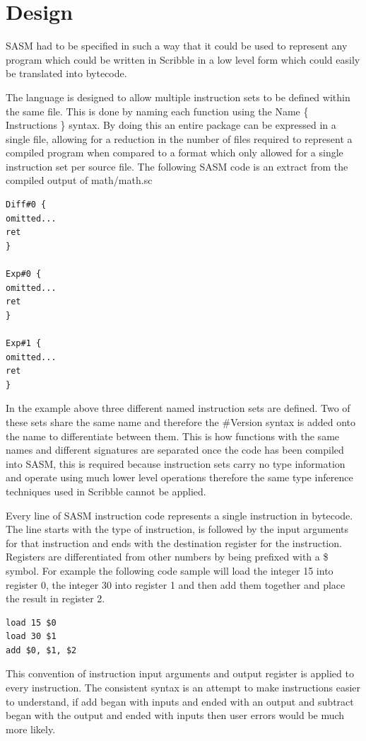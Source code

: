 \documentclass[]{final_report}
\begin{document}
\section{Design}

SASM had to be specified in such a way that it could be used to represent any program which could be written in Scribble in a low level form which could easily be translated into bytecode.

The language is designed to allow multiple instruction sets to be defined within the same file. This is done by naming each function using the Name \{ Instructions \} syntax. By doing this an entire package can be expressed in a single file, allowing for a reduction in the number of files required to represent a compiled program when compared to a format which only allowed for a single instruction set per source file. The following SASM code is an extract from the compiled output of math/math.sc

\begin{verbatim}
Diff#0 {
omitted...
ret
}

Exp#0 {
omitted...
ret
}

Exp#1 {
omitted...
ret
}
\end{verbatim}

In the example above three different named instruction sets are defined. Two of these sets share the same name and therefore the \#Version syntax is added onto the name to differentiate between them. This is how functions with the same names and different signatures are separated once the code has been compiled into SASM, this is required because instruction sets carry no type information and operate using much lower level operations therefore the same type inference techniques used in Scribble cannot be applied.

Every line of SASM instruction code represents a single instruction in bytecode. The line starts with the type of instruction, is followed by the input arguments for that instruction and ends with the destination register for the instruction. Registers are differentiated from other numbers by being prefixed with a \$ symbol. For example the following code sample will load the integer 15 into register 0, the integer 30 into register 1 and then add them together and place the result in register 2.

\begin{verbatim}
load 15 $0
load 30 $1
add $0, $1, $2
\end{verbatim}

This convention of instruction input arguments and output register is applied to every instruction. The consistent syntax is an attempt to make instructions easier to understand, if add began with inputs and ended with an output and subtract began with the output and ended with inputs then user errors would be much more likely.
\end{document}

